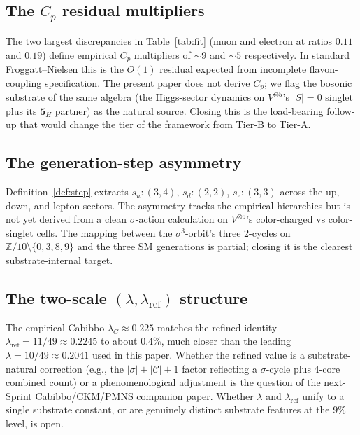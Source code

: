 \documentclass[11pt,reqno]{amsart}
\theoremstyle{plain}
\theoremstyle{definition}
\theoremstyle{remark}
\newcommand{\Z}{\mathbb{Z}}
\newcommand{\Cfour}{\mathcal{C}}  %
\newcommand{\barrep}[1]{\bar{\mathbf{#1}}}
\begin{document}
\subsection{The $C_{p}$ residual multipliers}
The two largest discrepancies in Table~\ref{tab:fit} (muon and
electron at ratios $0.11$ and $0.19$) define empirical $C_p$
multipliers of $\sim 9$ and $\sim 5$ respectively. In standard
Froggatt--Nielsen this is the $O(1)$ residual expected from
incomplete flavon-coupling specification. The present paper
does not derive $C_{p}$; we flag the bosonic substrate of the
same algebra (the Higgs-sector dynamics on $V^{\otimes 5}$'s
$|S|=0$ singlet plus its $\barrep{5}_{H}$ partner) as the
natural source. Closing this is the load-bearing follow-up
that would change the tier of the framework from Tier-B to
Tier-A.

\subsection{The generation-step asymmetry}
Definition~\ref{def:step} extracts $s_{u} : (3, 4)$, $s_{d} :
(2, 2)$, $s_{e} : (3, 3)$ across the up, down, and lepton
sectors. The asymmetry tracks the empirical hierarchies but is
not yet derived from a clean $\sigma$-action calculation on
$V^{\otimes 5}$'s color-charged vs color-singlet cells. The
mapping between the $\sigma^{3}$-orbit's three $2$-cycles on
$\Z/10\setminus\{0,3,8,9\}$ and the three SM generations is
partial; closing it is the clearest substrate-internal target.

\subsection{The two-scale $(\lambda, \lambda_{\mathrm{ref}})$ structure}
The empirical Cabibbo $\lambda_{C} \approx 0.225$ matches the
refined identity $\lambda_{\mathrm{ref}} = 11/49 \approx
0.2245$ to about $0.4\%$, much closer than the leading
$\lambda = 10/49 \approx 0.2041$ used in this paper. Whether
the refined value is a substrate-natural correction (e.g.,
the $|\sigma| + |\Cfour| + 1$ factor reflecting a
$\sigma$-cycle plus $4$-core combined count) or a
phenomenological adjustment is the question of the next-Sprint
Cabibbo/CKM/PMNS companion paper. Whether $\lambda$ and
$\lambda_{\mathrm{ref}}$ unify to a single substrate constant,
or are genuinely distinct substrate features at the $9\%$
level, is open.
\end{document}

